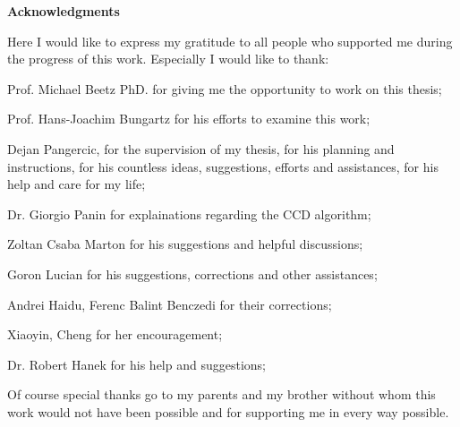 \clearemptydoublepage
{}
{}        



\vspace*{2cm}

\begin{center}
{\Large \bf Acknowledgments}
\end{center}

\vspace{1cm}




Here I would like to express my gratitude to all people who supported me during the
progress of this work. Especially I would like to thank:

Prof. Michael Beetz PhD. for giving me the opportunity to work on this thesis;

Prof. Hans-Joachim Bungartz for his efforts to examine this work;

Dejan Pangercic, for the supervision of my thesis, for his planning and instructions,
for his countless ideas, suggestions, efforts and assistances, for his help and care for
my life;

Dr. Giorgio Panin for explainations regarding the CCD algorithm;

Zoltan Csaba Marton for his suggestions and helpful discussions;

Goron Lucian for his suggestions, corrections and other assistances;

Andrei Haidu, Ferenc Balint Benczedi for their corrections;

Xiaoyin, Cheng for her encouragement;

Dr. Robert Hanek for his help and suggestions;

Of course special thanks go to my parents and my brother without whom this work
would not have been possible and for supporting me in every way possible.

